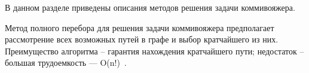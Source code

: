 \label{cha:A}
В данном разделе приведены описания методов решения задачи коммивояжера.

Метод полного перебора для решения задачи коммивояжера предполагает рассмотрение всех возможных путей в графе и выбор кратчайшего из них.
Преимущество алгоритма -- гарантия нахождения кратчайшего пути; недостаток -- большая трудоемкость — O(n!)~\cite{ulianov}.
